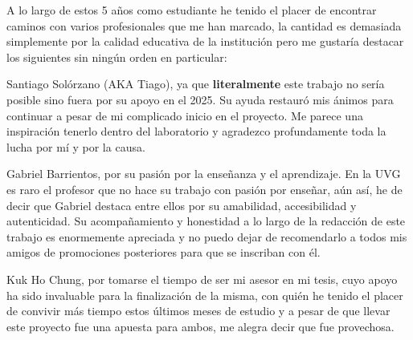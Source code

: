 A lo largo de estos 5 años como estudiante he tenido el placer de encontrar caminos con varios profesionales que me han marcado, la cantidad es demasiada simplemente por la calidad educativa de la institución pero me gustaría destacar los siguientes sin ningún orden en particular:

Santiago Solórzano (AKA Tiago), ya que \textbf{literalmente} este trabajo no sería posible sino fuera por su apoyo en el 2025. Su ayuda restauró mis ánimos para continuar a pesar de mi complicado inicio en el proyecto. Me parece una inspiración tenerlo dentro del laboratorio y agradezco profundamente toda la lucha por mí y por la causa.

Gabriel Barrientos, por su pasión por la enseñanza y el aprendizaje. En la UVG es raro el profesor que no hace su trabajo con pasión por enseñar, aún así, he de decir que Gabriel destaca entre ellos por su amabilidad, accesibilidad y autenticidad. Su acompañamiento y honestidad a lo largo de la redacción de este trabajo es enormemente apreciada y no puedo dejar de recomendarlo a todos mis amigos de promociones posteriores para que se inscriban con él.

Kuk Ho Chung, por tomarse el tiempo de ser mi asesor en mi tesis, cuyo apoyo ha sido invaluable para la finalización de la misma, con quién he tenido el placer de convivir más tiempo estos últimos meses de estudio y a pesar de que llevar este proyecto fue una apuesta para ambos, me alegra decir que fue provechosa.
